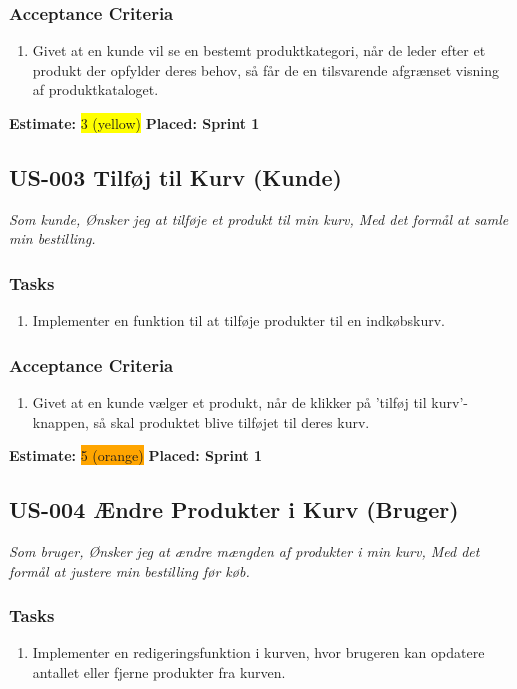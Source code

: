 \subsubsection*{\textbf{Acceptance Criteria}}
\begin{enumerate}
  \item Givet at en kunde vil se en bestemt produktkategori, når de leder efter et produkt der opfylder deres behov, så får de en tilsvarende afgrænset visning af produktkataloget.
\end{enumerate}
\textbf{Estimate:} \colorbox{yellow}{3 (yellow)}
\textbf{Placed: Sprint 1}
\par\noindent\dotfill

\subsection{US-003 Tilføj til Kurv (Kunde)}
\label{sec:US-003}
\textit{Som kunde, Ønsker jeg at tilføje et produkt til min kurv, Med det formål at samle min bestilling.}
\subsubsection*{\textbf{Tasks}}
\begin{enumerate}
  \item Implementer en funktion til at tilføje produkter til en indkøbskurv.
\end{enumerate}
\subsubsection*{\textbf{Acceptance Criteria}}
\begin{enumerate}
  \item Givet at en kunde vælger et produkt, når de klikker på 'tilføj til kurv'-knappen, så skal produktet blive tilføjet til deres kurv.
\end{enumerate}
\textbf{Estimate:} \colorbox{orange}{5 (orange)}
\textbf{Placed: Sprint 1}
\par\noindent\dotfill

\subsection{US-004 Ændre Produkter i Kurv (Bruger)}
\label{sec:US-004}
\textit{Som bruger, Ønsker jeg at ændre mængden af produkter i min kurv, Med det formål at justere min bestilling før køb.}
\subsubsection*{\textbf{Tasks}}
\begin{enumerate}
  \item Implementer en redigeringsfunktion i kurven, hvor brugeren kan opdatere antallet eller fjerne produkter fra kurven.
\end{enumerate}

